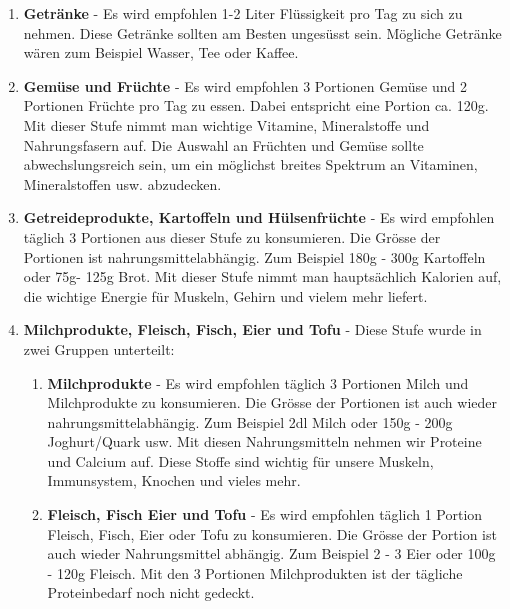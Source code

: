 \begin{enumerate}
  \item \textbf{Getränke} - Es wird empfohlen 1-2 Liter Flüssigkeit pro Tag zu sich zu nehmen. Diese Getränke sollten am Besten ungesüsst sein. Mögliche Getränke wären zum Beispiel Wasser, Tee oder Kaffee. \cite{stufe_getraenke}
  \item \textbf{Gemüse und Früchte} - Es wird empfohlen 3 Portionen Gemüse und 2 Portionen Früchte pro Tag zu essen. Dabei entspricht eine Portion ca. 120g.
  \newline
  Mit dieser Stufe nimmt man wichtige Vitamine, Mineralstoffe und Nahrungsfasern auf.
  \newline
  Die Auswahl an Früchten und Gemüse sollte abwechslungsreich sein, um ein möglichst breites Spektrum an Vitaminen, Mineralstoffen usw. abzudecken. \cite{stufe_gemuese_fruechte}
  \item \textbf{Getreideprodukte, Kartoffeln und Hülsenfrüchte} - Es wird empfohlen täglich 3 Portionen aus dieser Stufe zu konsumieren. Die Grösse der Portionen ist nahrungsmittelabhängig. Zum Beispiel 180g - 300g Kartoffeln oder 75g- 125g Brot.
  \newline
  Mit dieser Stufe nimmt man hauptsächlich Kalorien auf, die wichtige Energie für Muskeln, Gehirn und vielem mehr liefert. \cite{stufe_getreideprodukte_kartoffeln_huelsenfruechte}
  \item \textbf{Milchprodukte, Fleisch, Fisch, Eier und Tofu} - Diese Stufe wurde in zwei Gruppen unterteilt: 
    \begin{enumerate}
    \item \textbf{Milchprodukte} - Es wird empfohlen täglich 3 Portionen Milch und Milchprodukte zu konsumieren. Die Grösse der Portionen ist auch wieder nahrungsmittelabhängig. Zum Beispiel 2dl Milch oder 150g - 200g Joghurt/Quark usw.
    \newline
    Mit diesen Nahrungsmitteln nehmen wir Proteine und Calcium auf. Diese Stoffe sind wichtig für unsere Muskeln, Immunsystem, Knochen und vieles mehr. \cite{stufe_milch_milchprodukte}
    \item \textbf{Fleisch, Fisch Eier und Tofu} - Es wird empfohlen täglich 1 Portion Fleisch, Fisch, Eier oder Tofu zu konsumieren. Die Grösse der Portion ist auch wieder Nahrungsmittel abhängig. Zum Beispiel 2 - 3 Eier oder 100g - 120g Fleisch.
    \newline
    Mit den 3 Portionen Milchprodukten ist der tägliche Proteinbedarf noch nicht gedeckt. 
    \newline

\end{enumerate}
\end{enumerate}
